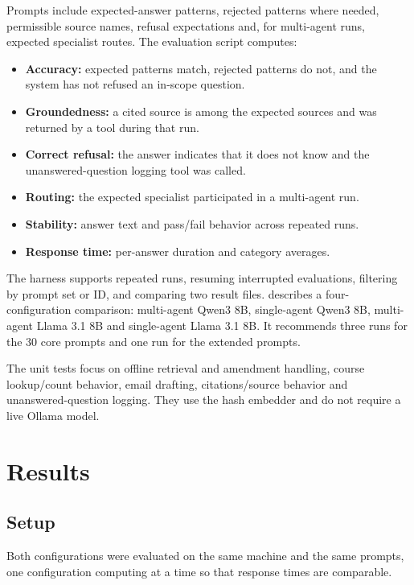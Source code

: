 \documentclass[11pt,a4paper]{article}
\newcommand{\code}[1]{\texttt{\detokenize{#1}}}
\begin{document}
Prompts include expected-answer patterns, rejected patterns where needed, permissible source names, refusal expectations and, for multi-agent runs, expected specialist routes. The evaluation script computes:
\begin{itemize}
  \item \textbf{Accuracy:} expected patterns match, rejected patterns do not, and the system has not refused an in-scope question.
  \item \textbf{Groundedness:} a cited source is among the expected sources and was returned by a tool during that run.
  \item \textbf{Correct refusal:} the answer indicates that it does not know and the unanswered-question logging tool was called.
  \item \textbf{Routing:} the expected specialist participated in a multi-agent run.
  \item \textbf{Stability:} answer text and pass/fail behavior across repeated runs.
  \item \textbf{Response time:} per-answer duration and category averages.
\end{itemize}

The harness supports repeated runs, resuming interrupted evaluations, filtering by prompt set or ID, and comparing two result files. \code{EVAL_STEPS.md} describes a four-configuration comparison: multi-agent Qwen3 8B, single-agent Qwen3 8B, multi-agent Llama 3.1 8B and single-agent Llama 3.1 8B. It recommends three runs for the 30 core prompts and one run for the extended prompts.

The unit tests focus on offline retrieval and amendment handling, course lookup/count behavior, email drafting, citations/source behavior and unanswered-question logging. They use the hash embedder and do not require a live Ollama model.

\section{Results}

\subsection{Setup}

Both configurations were evaluated on the same machine and the same prompts, one configuration computing at a time so that response times are comparable.
\end{document}

